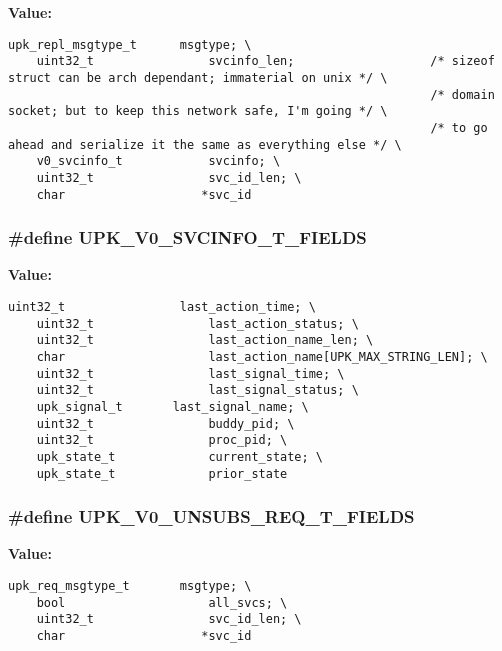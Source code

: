 \textbf{Value:}

\begin{Code}\begin{verbatim}upk_repl_msgtype_t      msgtype; \
    uint32_t                svcinfo_len;                   /* sizeof struct can be arch dependant; immaterial on unix */ \
                                                           /* domain socket; but to keep this network safe, I'm going */ \
                                                           /* to go ahead and serialize it the same as everything else */ \
    v0_svcinfo_t            svcinfo; \
    uint32_t                svc_id_len; \
    char                   *svc_id
\end{verbatim}\end{Code}
\subsubsection{\setlength{\rightskip}{0pt plus 5cm}\#define UPK\_\-V0\_\-SVCINFO\_\-T\_\-FIELDS}\label{upk__v0__protocol__structs_8h_dcbe09c6950713c06fd926abcc6dd8a2}


\textbf{Value:}

\begin{Code}\begin{verbatim}uint32_t                last_action_time; \
    uint32_t                last_action_status; \
    uint32_t                last_action_name_len; \
    char                    last_action_name[UPK_MAX_STRING_LEN]; \
    uint32_t                last_signal_time; \
    uint32_t                last_signal_status; \
    upk_signal_t       last_signal_name; \
    uint32_t                buddy_pid; \
    uint32_t                proc_pid; \
    upk_state_t             current_state; \
    upk_state_t             prior_state
\end{verbatim}\end{Code}
\subsubsection{\setlength{\rightskip}{0pt plus 5cm}\#define UPK\_\-V0\_\-UNSUBS\_\-REQ\_\-T\_\-FIELDS}\label{upk__v0__protocol__structs_8h_38cd9e753bddc67a4aa0a538b825b387}


\textbf{Value:}

\begin{Code}\begin{verbatim}upk_req_msgtype_t       msgtype; \
    bool                    all_svcs; \
    uint32_t                svc_id_len; \
    char                   *svc_id
\end{verbatim}\end{Code}
